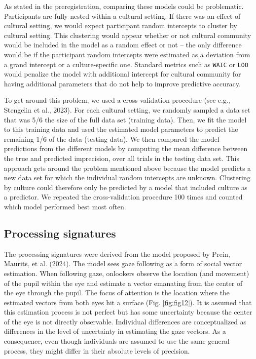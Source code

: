 \documentclass[
  man,floatsintext]{apa7}
\begin{document}
As stated in the preregistration, comparing these models could be problematic. Participants are fully nested within a cultural setting. If there was an effect of cultural setting, we would expect participant random intercepts to cluster by cultural setting. This clustering would appear whether or not cultural community would be included in the model as a random effect or not -- the only difference would be if the participant random intercepts were estimated as a deviation from a grand intercept or a culture-specific one. Standard metrics such as \texttt{WAIC} or \texttt{LOO} would penalize the model with additional intercept for cultural community for having additional parameters that do not help to improve predictive accuracy.

To get around this problem, we used a cross-validation procedure (see e.g., Stengelin et al., 2023). For each cultural setting, we randomly sampled a data set that was 5/6 the size of the full data set (training data). Then, we fit the model to this training data and used the estimated model parameters to predict the remaining 1/6 of the data (testing data). We then compared the model predictions from the different models by computing the mean difference between the true and predicted imprecision, over all trials in the testing data set. This approach gets around the problem mentioned above because the model predicts a new data set for which the individual random intercepts are unknown. Clustering by culture could therefore only be predicted by a model that included culture as a predictor. We repeated the cross-validation procedure 100 times and counted which model performed best most often.

\subsection{Processing signatures}\label{processing-signatures}

The processing signatures were derived from the model proposed by Prein, Maurits, et al. (2024). The model sees gaze following as a form of social vector estimation. When following gaze, onlookers observe the location (and movement) of the pupil within the eye and estimate a vector emanating from the center of the eye through the pupil. The focus of attention is the location where the estimated vectors from both eyes hit a surface (Fig. \ref{fig:fig12}). It is assumed that this estimation process is not perfect but has some uncertainty because the center of the eye is not directly observable. Individual differences are conceptualized as differences in the level of uncertainty in estimating the gaze vectors. As a consequence, even though individuals are assumed to use the same general process, they might differ in their absolute levels of precision.
\end{document}
